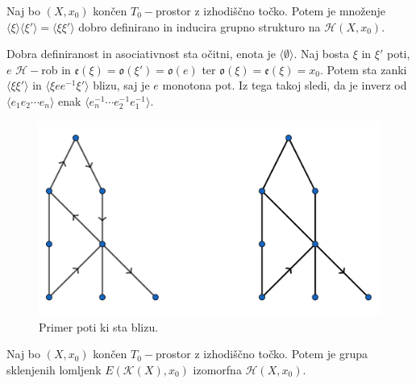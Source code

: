 \documentclass[mat1]{fmfdelo}
\DeclareRobustCommand{\h}{
    \mathcal{H}}
\begin{document}
  
  
\begin{izrek}
Naj bo $(X,x_0)$ končen $T_0-$prostor z izhodiščno točko. Potem je množenje $\langle\xi\rangle\langle\xi'\rangle=\langle\xi\xi'\rangle$ dobro definirano in inducira grupno strukturo na $\mathscr{H}(X,x_0)$.
\end{izrek}

\begin{dokaz}
Dobra definiranost in asociativnost sta očitni, enota je $\langle\emptyset\rangle$. Naj bosta $\xi$ in $\xi'$ poti, $e$ $\h-$rob in $\mathfrak{e}(\xi)=\mathfrak{o}(\xi')=\mathfrak{o}(e)$ ter $\mathfrak{o}(\xi)=\mathfrak{e}(\xi)=x_0$. Potem sta zanki $\langle\xi \xi'\rangle$ in $\langle\xi e e^{-1} \xi'\rangle$ blizu, saj je $e$ monotona pot. Iz tega takoj sledi, da je inverz od $\langle e_1 e_2 \cdots e_n\rangle$ enak $\langle e_n^{-1} \cdots e_2^{-1}e_1^{-1}\rangle$.
\end{dokaz}

\begin{figure}[h!]
    \centering
    \includegraphics[width=0.6\linewidth]{poti.png}
    \caption{Primer poti ki sta blizu.}
\end{figure}

\begin{izrek}
Naj bo $(X,x_0)$ končen $T_0-$prostor z izhodiščno točko. Potem je grupa sklenjenih lomljenk $E(\mathcal{K}(X),x_0)$ izomorfna $\mathscr{H}(X,x_0)$.
\end{izrek}
\end{document}
